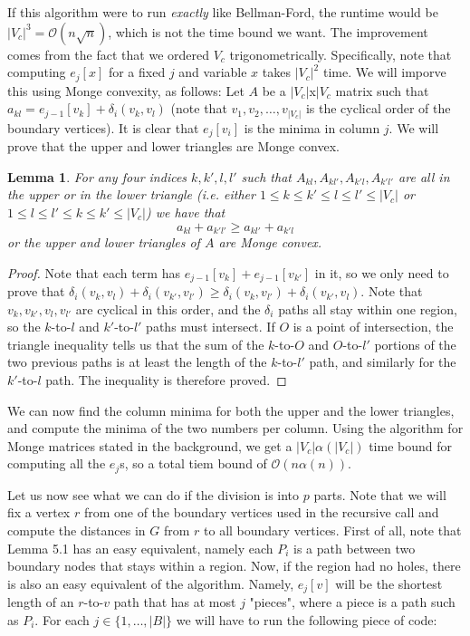 \documentclass[11pt]{article}
\newtheorem{lemma}[theorem]{Lemma}
\begin{document}
If this algorithm were to run \textit{exactly} like Bellman-Ford, the runtime would be $|V_c|^3 = \mathcal{O}(n\sqrt{n})$, which is not the time bound we want. The improvement comes from the fact that we ordered $V_c$ trigonometrically. Specifically, note that computing $e_j[x]$ for a fixed $j$ and variable $x$ takes $|V_c|^2$ time. We will imporve this using Monge convexity, as follows: Let $A$ be a $|V_c|$x$|V_c$ matrix such that $a_{kl} = e_{j-1}[v_k]+\delta_i(v_k,v_l)$ (note that $v_1,v_2,\ldots,v_{|V_c|}$ is the cyclical order of the boundary vertices). It is clear that $e_j[v_i]$ is the minima in column $j$. We will prove that the upper and lower triangles are Monge convex.

\begin{lemma}
For any four indices $k,k',l,l'$ such that $A_{kl}, A_{kl'}, A_{k'l}, A_{k'l'}$ are all in the upper or in the lower triangle (i.e. either $1\leq k\leq k'\leq l\leq l'\leq |V_c|$ or $1\leq l\leq l'\leq k\leq k'\leq |V_c|$) we have that $$a_{kl}+a_{k'l'} \geq a_{kl'}+a_{k'l}$$ or the upper and lower triangles of $A$ are Monge convex.
\end{lemma}

\begin{proof}
Note that each term has $e_{j-1}[v_k] + e_{j-1}[v_{k'}]$ in it, so we only need to prove that $\delta_i(v_k,v_l) + \delta_i(v_{k'},v_{l'}) \geq \delta_i(v_k,v_{l'})+\delta_i(v_{k'},v_l)$. Note that $v_k,v_{k'},v_l,v_{l'}$ are cyclical in this order, and the $\delta_i$ paths all stay within one region, so the $k$-to-$l$ and $k'$-to-$l'$ paths must intersect. If $O$ is a point of intersection, the triangle inequality tells us that the sum of the $k$-to-$O$ and $O$-to-$l'$ portions of the two previous paths is at least the length of the $k$-to-$l'$ path, and similarly for the $k'$-to-$l$ path. The inequality is therefore proved.
\end{proof}

We can now find the column minima for both the upper and the lower triangles, and compute the minima of the two numbers per column. Using the algorithm for Monge matrices stated in the background, we get a $|V_c|\alpha(|V_c|)$ time bound for computing all the $e_j$s, so a total tiem bound of $\mathcal{O}(n\alpha(n))$.

Let us now see what we can do if the division is into $p$ parts. Note that we will fix a vertex $r$ from one of the boundary vertices used in the recursive call and compute the distances in $G$ from $r$ to all boundary vertices. First of all, note that Lemma 5.1 has an easy equivalent, namely each $P_i$ is a path between two boundary nodes that stays within a region. Now, if the region had no holes, there is also an easy equivalent of the algorithm. Namely, $e_j[v]$ will be the shortest length of an $r$-to-$v$ path that has at most $j$ "pieces", where a piece is a path such as $P_i$. For each $j\in \{1,\ldots,|B|\}$ we will have to run the following piece of code:
\end{document}
